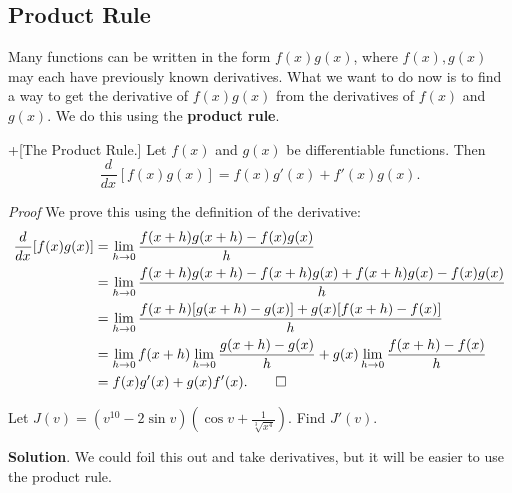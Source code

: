 \documentclass[10pt,]{book}
\makeatletter
\newcommand{\terminology}[1]{\textbf{#1}}
\theoremstyle{ptxplainnotitle}
\theoremstyle{ptxplaintitle}
\theoremstyle{ptxplainnotitle}
\theoremstyle{ptxplaintitle}
\theoremstyle{ptxplainnotitle}
\theoremstyle{ptxplaintitle}
\renewcommand*{\proofname}{Proof}
\renewenvironment{proof}[1][\proofname]{\par
  \pushQED{\qed}%
  \normalfont \topsep6\p@\@plus6\p@\relax
  \trivlist
  \item\relax
    {\itshape
    #1\@addpunct{.}}\hspace\labelsep\ignorespaces
}{%
  \popQED\endtrivlist\@endpefalse
}
\theoremstyle{ptxdefinitionnotitle}
\theoremstyle{ptxdefinitiontitle}
\theoremstyle{ptxdefinitionnotitle}
\theoremstyle{ptxdefinitiontitle}
\theoremstyle{ptxdefinitionnotitle}
\theoremstyle{ptxdefinitiontitle}
\theoremstyle{ptxdefinitionnotitle}
\theoremstyle{ptxdefinitiontitle}
\theoremstyle{ptxdefinitionnotitle}
\theoremstyle{ptxdefinitiontitle}
\numberwithin{equation}{section}
\newcommand{\dv}[3][]{\dfrac{d^{#1} #2}{d #3^{#1}}}
\makeatother
\begin{document}
\subsection[{Product Rule}]{Product Rule}\label{subsection-product-rule}
\hypertarget{p-139}{}%
Many functions can be written in the form \(f(x)g(x)\), where \(f(x),g(x)\) may each have previously known derivatives. What we want to do now is to find a way to get the derivative of \(f(x)g(x)\) from the derivatives of \(f(x)\) and \(g(x)\). We do this using the \terminology{product rule}.%
\begin{theorem}+[{The Product Rule.}]\label{theorem-the-product-rule}
\hypertarget{p-140}{}%
Let \(f(x)\) and \(g(x)\) be differentiable functions. Then%
\begin{equation*}
\dv{}{x}[f(x)g(x)] = f(x)g'(x) + f'(x)g(x).
\end{equation*}
%
\end{theorem}
\begin{proof}\hypertarget{proof-3}{}
\hypertarget{p-141}{}%
We prove this using the definition of the derivative:%
\begin{align*}
\dv{}{x}[f(x)g(x)] & = \lim_{h\to0}\frac{f(x+h)g(x+h) - f(x)g(x)}{h} \\
& = \lim_{h\to0}\frac{f(x+h)g(x+h) - f(x+h)g(x) + f(x+h)g(x) - f(x)g(x)}{h} \\
& = \lim_{h\to0}\frac{f(x+h)[g(x+h) - g(x)] + g(x)[f(x+h) - f(x)]}{h} \\
& = \lim_{h\to0}f(x+h)\lim_{h\to0}\frac{g(x+h) - g(x)}{h} + g(x)\lim_{h\to0}\frac{f(x+h) - f(x)}{h} \\
& = f(x)g'(x) + g(x)f'(x). \qedhere
\end{align*}
%
\end{proof}
\begin{example}\label{example-using-the-product-rule}
\hypertarget{p-142}{}%
Let \(J(v) = (v^{10} - 2\sin v)(\cos v + \frac{1}{\sqrt[3]{x^{4}}})\). Find \(J'(v)\).%
\par\smallskip%
\noindent\textbf{Solution}.\hypertarget{solution-28}{}\quad%
\hypertarget{p-143}{}%
We could foil this out and take derivatives, but it will be easier to use the product rule.%
\end{example}
\typeout{************************************************}
\typeout{************************************************}
\end{document}
